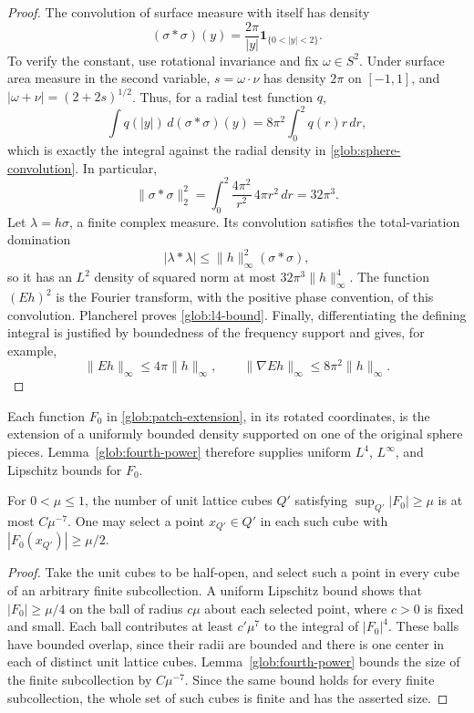 \begin{proof}
The convolution of surface measure with itself has density
\begin{equation}\label{glob:sphere-convolution}
       (\sigma*\sigma)(y)=\frac{2\pi}{|y|}
                               \mathbf1_{\{0<|y|<2\}}.
\end{equation}
To verify the constant, use rotational invariance and fix
$\omega\in S^2$. Under surface area measure in the second variable,
$s=\omega\cdot\nu$ has density $2\pi$ on $[-1,1]$, and
$|\omega+\nu|=(2+2s)^{1/2}$. Thus, for a radial test function $q$,
\[
 \int q(|y|)\,d(\sigma*\sigma)(y)
     =8\pi^2\int_0^2q(r)r\,dr,
\]
which is exactly the integral against the radial density in
\eqref{glob:sphere-convolution}. In particular,
\[
       \|\sigma*\sigma\|_2^2
       =\int_0^2\frac{4\pi^2}{r^2}\,4\pi r^2\,dr
       =32\pi^3.
\]
Let $\lambda=h\sigma$, a finite complex measure. Its convolution
satisfies the total-variation domination
\[
       |\lambda*\lambda|\le\|h\|_\infty^2(\sigma*\sigma),
\]
so it has an $L^2$ density of squared norm at most
$32\pi^3\|h\|_\infty^4$. The function $(Eh)^2$ is the Fourier
transform, with the positive phase convention, of this convolution.
Plancherel proves \eqref{glob:l4-bound}. Finally, differentiating the
defining integral is justified by boundedness of the frequency support
and gives, for example,
\[
       \|Eh\|_\infty\le4\pi\|h\|_\infty,
       \qquad \|\nabla Eh\|_\infty\le8\pi^2\|h\|_\infty.
\]
\end{proof}

Each function $F_0$ in \eqref{glob:patch-extension}, in its rotated
coordinates, is the extension of a uniformly bounded density supported
on one of the original sphere pieces. Lemma~\ref{glob:fourth-power}
therefore supplies uniform $L^4$, $L^\infty$, and Lipschitz bounds for
$F_0$.

\begin{lemma}\label{glob:initial-peaks}
For $0<\mu\le1$, the number of unit lattice cubes $Q'$ satisfying
$\sup_{Q'}|F_0|\ge\mu$ is at most $C\mu^{-7}$.
One may select a point $x_{Q'}\in Q'$ in each such cube with
$|F_0(x_{Q'})|\ge\mu/2$.
\end{lemma}

\begin{proof}
Take the unit cubes to be half-open, and select such a point in every
cube of an arbitrary finite subcollection. A uniform Lipschitz bound
shows that $|F_0|\ge\mu/4$ on the ball of radius $c\mu$ about each
selected point, where $c>0$ is fixed and small. Each ball contributes
at least $c'\mu^7$ to the integral of $|F_0|^4$. These balls have
bounded overlap, since their radii are bounded and there is one center
in each of distinct unit lattice cubes. Lemma~\ref{glob:fourth-power}
bounds the size of the finite subcollection by $C\mu^{-7}$. Since
the same bound holds for every finite subcollection, the whole set of
such cubes is finite and has the asserted size.
\end{proof}

